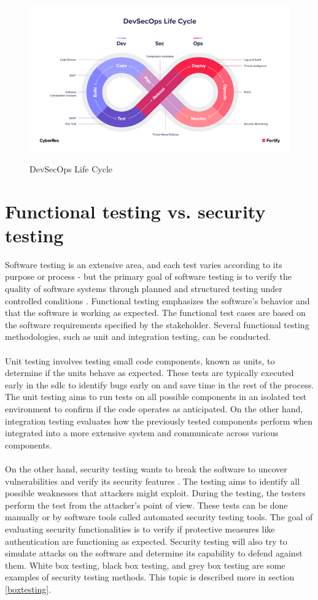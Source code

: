 \begin{figure}[H]
    \centering
    \includegraphics[width=0.8\columnwidth]{Images/devsec.png}
    \caption{DevSecOps Life Cycle}
    \label{fig: DevSecOps Life Cycle}\cite{devsecopsbilde}
\end{figure}


\section{Functional testing vs. security testing}
\label{Functional Testing vs Security Testing}
Software testing is an extensive area, and each test varies according to its purpose or process - but the primary goal of software testing is to verify the quality of software systems through planned and structured testing under controlled conditions \cite{difftesting}. Functional testing emphasizes the software's behavior and that the software is working as expected. The functional test cases are based on the software requirements specified by the stakeholder. Several functional testing methodologies, such as unit and integration testing, can be conducted. 
\\~\\
Unit testing involves testing small code components, known as units, to determine if the units behave as expected\cite{unitvsintergration}. These tests are typically executed early in the \acrshort{sdlc} to identify bugs early on and save time in the rest of the process. The unit testing aims to run tests on all possible components in an isolated test environment to confirm if the code operates as anticipated. On the other hand, integration testing evaluates how the previously tested components perform when integrated into a more extensive system and communicate across various components.
\\~\\
On the other hand, security testing wants to break the software to uncover vulnerabilities and verify its security features \cite{whysectest}. The testing aims to identify all possible weaknesses that attackers might exploit. During the testing, the testers perform the test from the attacker's point of view. These tests can be done manually or by software tools called automated security testing tools. The goal of evaluating security functionalities is to verify if protective measures like authentication are functioning as expected. Security testing will also try to simulate attacks on the software and determine its capability to defend against them. White box testing, black box testing, and grey box testing are some examples of security testing methods. This topic is described more in section \ref{boxtesting}. 

